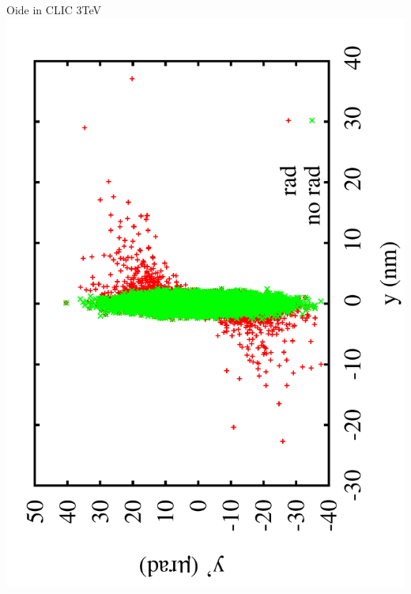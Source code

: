 \documentclass{beamer}
\begin{document}
\begin{frame}{Oide in CLIC 3TeV}
 \includegraphics[scale=0.2,angle=-90]{plotyrad.pdf}\\\centering

\end{frame}
\end{document}
